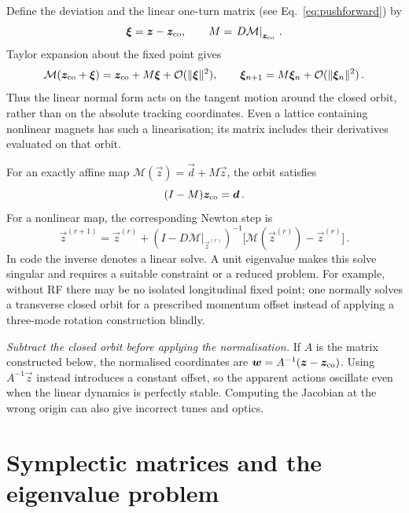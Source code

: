 Define the deviation and the linear one-turn matrix (see
Eq.~\eqref{eq:pushforward}) by
\begin{equation}\label{eq:lnf-deviation}
    \vec\xi = \vec z-\vec z_{\rm co},
    \qquad M = \left.D\mathcal M\right|_{\vec z_{\rm co}}\,.
\end{equation}
Taylor expansion about the fixed point gives
\begin{equation}\label{eq:lnf-linearisation}
    \mathcal M(\vec z_{\rm co} + \vec\xi) = \vec z_{\rm co} + M\vec\xi + \mathcal O(\|\vec\xi\|^2),
    \qquad
    \vec\xi_{n + 1} = M\vec\xi_n + \mathcal O(\|\vec\xi_n\|^2)\,.
\end{equation}
Thus the linear normal form acts on the tangent motion around the closed
orbit, rather than on the absolute tracking coordinates. Even a lattice
containing nonlinear magnets has such a linearisation; its matrix includes
their derivatives evaluated on that orbit.

For an exactly affine map $\mathcal M(\vec z) = \vec d + M\vec z$, the orbit
satisfies
\begin{equation}
    (I-M)\vec z_{\rm co} = \vec d\,.
\end{equation}
For a nonlinear map, the corresponding Newton step is
\begin{equation}\label{eq:lnf-newton}
    \vec z^{(r + 1)} = \vec z^{(r)} + (I-D\mathcal M|_{\vec z^{(r)}})^{-1}
    \bigl[\mathcal M(\vec z^{(r)})-\vec z^{(r)}\bigr]\,.
\end{equation}
In code the inverse denotes a linear solve. A unit eigenvalue makes this
solve singular and requires a suitable constraint or a reduced problem.
For example, without RF there may be no isolated longitudinal fixed point;
one normally solves a transverse closed orbit for a prescribed momentum
offset instead of applying a three-mode rotation construction blindly.

\emph{Subtract the closed orbit before applying the normalisation.}
If $A$ is the matrix constructed below, the normalised coordinates are
$\vec w = A^{-1}(\vec z-\vec z_{\rm co})$. Using $A^{-1}\vec z$ instead
introduces a constant offset, so the apparent actions oscillate even when
the linear dynamics is perfectly stable. Computing the Jacobian at the
wrong origin can also give incorrect tunes and optics.



\section{Symplectic matrices and the eigenvalue problem}
\label{sec:lnf-eigenproblem}

